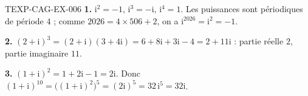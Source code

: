 \begin{corrige}{TEXP-CAG-EX-006}
\textbf{1.} $\mathrm{i}^2=-1$, $\mathrm{i}^3=-\mathrm{i}$, $\mathrm{i}^4=1$.
Les puissances sont périodiques de période $4$ ; comme
$2026=4\times506+2$, on a $\mathrm{i}^{2026}=\mathrm{i}^2=-1$.

\textbf{2.} $(2+\mathrm{i})^3=(2+\mathrm{i})(3+4\mathrm{i})
=6+8\mathrm{i}+3\mathrm{i}-4=2+11\mathrm{i}$ : partie réelle $2$, partie
imaginaire $11$.

\textbf{3.} $(1+\mathrm{i})^2=1+2\mathrm{i}-1=2\mathrm{i}$. Donc
$(1+\mathrm{i})^{10}=\big((1+\mathrm{i})^2\big)^5=(2\mathrm{i})^5
=32\,\mathrm{i}^5=32\mathrm{i}$.
\end{corrige}
